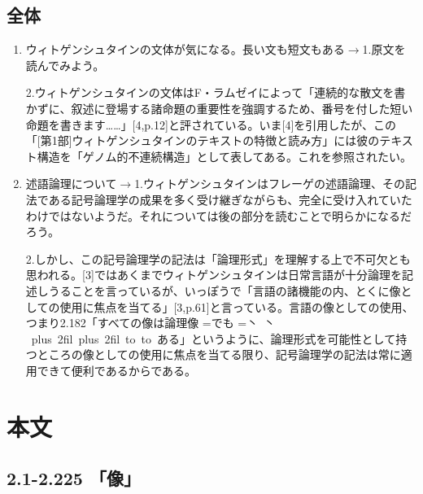 \documentclass[11pt,a4paper]{jsarticle}
\newcommand{\ruby}[2]{%
    \leavevmode
    \setbox0=\hbox{#1}%
    \setbox1=\hbox{\tiny #2}%
    \ifdim\wd0>\wd1 \dimen0=\wd0 \else \dimen0=\wd1 \fi
    \hbox{%
    \kanjiskip=0pt plus 2fil
    \xkanjiskip=0pt plus 2fil
    \vbox{%
    \hbox to \dimen0{%
    \tiny \hfil#2\hfil}%
    \nointerlineskip
    \hbox to \dimen0{\mathstrut\hfil#1\hfil}}}}
\begin{document}
\subsection{全体}
\begin{enumerate}
\item
ウィトゲンシュタインの文体が気になる。長い文も短文もある$\rightarrow$1.原文を読んでみよう。

2.ウィトゲンシュタインの文体はF・ラムゼイによって「連続的な散文を書かずに、叙述に登場する諸命題の重要性を強調するため、番号を付した短い命題を書きます……」[4,p.12]と評されている。いま[4]を引用したが、この「[第1部]ウィトゲンシュタインのテキストの特徴と読み方」には彼のテキスト構造を「ゲノム的不連続構造」として表してある。これを参照されたい。

\item
述語論理について$\rightarrow$1.ウィトゲンシュタインはフレーゲの述語論理、その記法である記号論理学の成果を多く受け継ぎながらも、完全に受け入れていたわけではないようだ。それについては後の部分を読むことで明らかになるだろう。

2.しかし、この記号論理学の記法は「論理形式」を理解する上で不可欠とも思われる。[3]ではあくまでウィトゲンシュタインは日常言語が十分論理を記述しうることを言っているが、いっぽうで「言語の諸機能の内、とくに像としての使用に焦点を当てる」[3,p.61]と言っている。言語の像としての使用、つまり2.182「すべての像は論理像\ruby{でも}{丶 丶}ある」というように、論理形式を可能性として持つところの像としての使用に焦点を当てる限り、記号論理学の記法は常に適用できて便利であるからである。

\end{enumerate}
\section{本文} \label{hombun}
\subsection{2.1-2.225 「像」}
\end{document}
